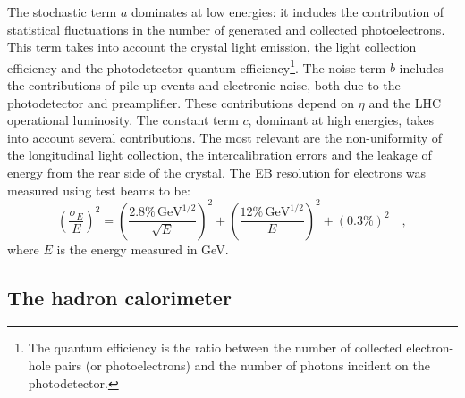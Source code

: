 The stochastic term $a$ dominates at low energies: it includes the contribution of statistical fluctuations in the number of generated and collected photoelectrons. This term takes into account the crystal light emission, the light collection efficiency and the photodetector quantum efficiency\footnote{The quantum efficiency is the ratio between the number of collected electron-hole pairs (or photoelectrons) and the number of photons incident on the photodetector.}. The noise term $b$ includes the contributions of pile-up events and electronic noise, both due to the photodetector and preamplifier. These contributions depend on $\eta$ and the LHC operational luminosity.
The constant term $c$, dominant at high energies, takes into account several contributions. The most relevant are the non-uniformity of the longitudinal light collection, the intercalibration errors and the leakage of energy from the rear side of the crystal. The EB resolution for electrons was measured using test beams to be:
\begin{equation}
\left(\frac{\sigma_E}{E}\right)^2 = \left(\frac{2.8\%\,\mathrm{GeV^{1/2}}}{\sqrt{E}}\right)^2 + \left(\frac{12\%\,\mathrm{GeV^{1/2}}}{E}\right)^2 + (0.3\%)^2 \quad,
\end{equation}
where $E$ is the energy measured in GeV.

\subsection{The hadron calorimeter}

